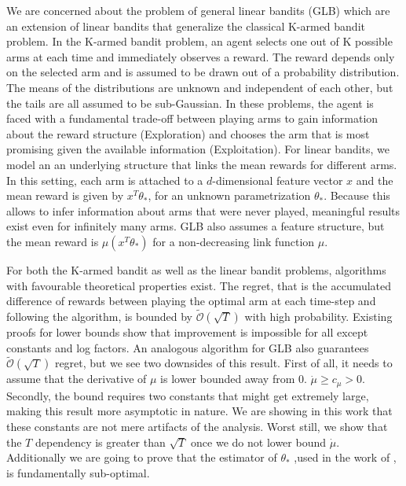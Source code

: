 \documentclass[twoside]{article} \usepackage{aistats2017}
\begin{document}
We are concerned about the problem of general linear bandits (GLB) which are an extension of linear bandits that generalize the classical K-armed bandit problem.
In the K-armed bandit problem, an agent selects one out of K possible arms at each time and immediately observes a reward.
The reward depends only on the selected arm and is assumed to be drawn out of a probability distribution. 
The means of the distributions are unknown and independent of each other, but the tails are all assumed to be sub-Gaussian.
In these problems, the agent is faced with a fundamental trade-off between playing arms to gain information about the reward structure (Exploration) and chooses the arm that is most promising given the available information (Exploitation).
For linear bandits, we model an an underlying structure that links the mean rewards for different arms. 
In this setting, each arm is attached to a $d$-dimensional feature vector $x$ and the mean reward is given by $x^T\theta_*$, for an unknown parametrization $\theta_*$.
Because this allows to infer information about arms that were never played, meaningful results exist even for infinitely many arms.
GLB also assumes a feature structure, but the mean reward is $\mu(x^T\theta_*)$ for a non-decreasing link function $\mu$.

For both the K-armed bandit as well as the linear bandit problems, algorithms with favourable theoretical properties exist. The regret, that is the accumulated difference of rewards between playing the optimal arm at each time-step and following the algorithm, is bounded by $\tilde{\mathcal{O}}(\sqrt{T})$ with high probability. 
Existing proofs for lower bounds show that improvement is impossible for all except constants and log factors.
An analogous algorithm for GLB also guarantees $\tilde{\mathcal{O}}(\sqrt{T})$ regret, but we see two downsides of this result. First of all, it needs to assume that the derivative of $\mu$ is lower bounded away from $0$. $\dot{\mu}\geq c_\mu > 0$. 
Secondly, the bound requires two constants that might get extremely large, making this result more asymptotic in nature. 
We are showing in this work that these constants are not mere artifacts of the analysis.
Worst still, we show that the $T$ dependency is greater than $\sqrt{T}$ once we do not lower bound $\dot{\mu}$.
Additionally we are going to prove that the estimator of $\theta_*$ ,used in the work of \cite{}, is fundamentally sub-optimal.
\end{document}
